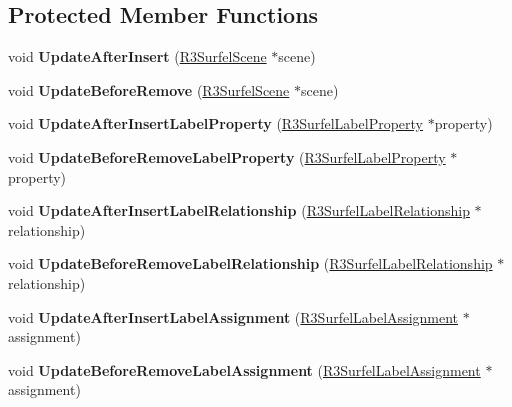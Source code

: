 \subsection*{Protected Member Functions}
\begin{DoxyCompactItemize}
\item 
void {\bfseries Update\+After\+Insert} (\hyperlink{class_r3_surfel_scene}{R3\+Surfel\+Scene} $\ast$scene)\hypertarget{class_r3_surfel_label_a0a0b408e12dfbab163b12f200676c013}{}\label{class_r3_surfel_label_a0a0b408e12dfbab163b12f200676c013}

\item 
void {\bfseries Update\+Before\+Remove} (\hyperlink{class_r3_surfel_scene}{R3\+Surfel\+Scene} $\ast$scene)\hypertarget{class_r3_surfel_label_a525e7a4ab723070f8900c4ecdf909e09}{}\label{class_r3_surfel_label_a525e7a4ab723070f8900c4ecdf909e09}

\item 
void {\bfseries Update\+After\+Insert\+Label\+Property} (\hyperlink{class_r3_surfel_label_property}{R3\+Surfel\+Label\+Property} $\ast$property)\hypertarget{class_r3_surfel_label_a091405d0a67c1195d7bb566f1f079e7e}{}\label{class_r3_surfel_label_a091405d0a67c1195d7bb566f1f079e7e}

\item 
void {\bfseries Update\+Before\+Remove\+Label\+Property} (\hyperlink{class_r3_surfel_label_property}{R3\+Surfel\+Label\+Property} $\ast$property)\hypertarget{class_r3_surfel_label_a4c0dd43aeb3aad46d4fdfaae314fa497}{}\label{class_r3_surfel_label_a4c0dd43aeb3aad46d4fdfaae314fa497}

\item 
void {\bfseries Update\+After\+Insert\+Label\+Relationship} (\hyperlink{class_r3_surfel_label_relationship}{R3\+Surfel\+Label\+Relationship} $\ast$relationship)\hypertarget{class_r3_surfel_label_a56c5cf7881603b3bd74393c2bacdf1e4}{}\label{class_r3_surfel_label_a56c5cf7881603b3bd74393c2bacdf1e4}

\item 
void {\bfseries Update\+Before\+Remove\+Label\+Relationship} (\hyperlink{class_r3_surfel_label_relationship}{R3\+Surfel\+Label\+Relationship} $\ast$relationship)\hypertarget{class_r3_surfel_label_ad9d11024abcae3f85eba724686adb9e2}{}\label{class_r3_surfel_label_ad9d11024abcae3f85eba724686adb9e2}

\item 
void {\bfseries Update\+After\+Insert\+Label\+Assignment} (\hyperlink{class_r3_surfel_label_assignment}{R3\+Surfel\+Label\+Assignment} $\ast$assignment)\hypertarget{class_r3_surfel_label_a1c2051536758514be2ca1cbfba01b931}{}\label{class_r3_surfel_label_a1c2051536758514be2ca1cbfba01b931}

\item 
void {\bfseries Update\+Before\+Remove\+Label\+Assignment} (\hyperlink{class_r3_surfel_label_assignment}{R3\+Surfel\+Label\+Assignment} $\ast$assignment)\hypertarget{class_r3_surfel_label_a795118e8cb76133660748a4fdcc37a33}{}\label{class_r3_surfel_label_a795118e8cb76133660748a4fdcc37a33}

\end{DoxyCompactItemize}
